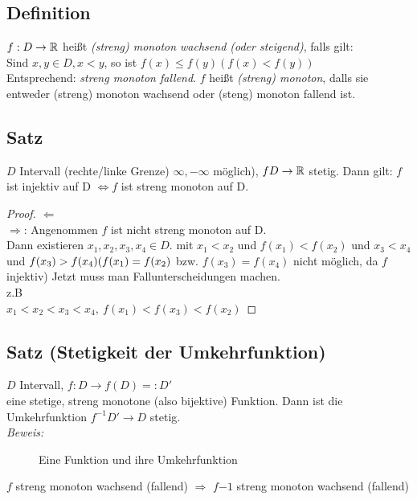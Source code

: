 \subsection{Definition}
$f: D \to \mathbb{R}$ hei\ss t {\em(streng) monoton wachsend (oder steigend)}, falls gilt:\\
Sind $x,y \in D, x < y$, so ist $f(x) \leq f(y) (f(x) < f(y))$\\
Entsprechend: {\em streng monoton fallend}. $f$ hei\ss t {\em (streng) monoton}, dalls sie entweder (streng) monoton wachsend oder (steng) monoton fallend ist.
\subsection[Satz: Injektive Funktionen nur bei Monotonie]{Satz}
$D$ Intervall (rechte/linke Grenze) $\infty,-\infty$ möglich), $f D \to \mathbb{R}$ stetig. Dann gilt: $f$ ist injektiv auf D $\Leftrightarrow f $ ist streng monoton auf D.
\begin{proof}
$\Leftarrow$ \checkmark \\
$\Rightarrow$: Angenommen $f$ ist nicht streng monoton auf D.\\
Dann existieren $x_1,x_2,x_3,x_4 \in D.$ mit $x_1 < x_2$ und $f(x_1) < f(x_2)$ und $x_3 < x_4$ und $f(x_3) > f(x_4)\\
(f(x_1) = f(x_2)$ bzw. $f(x_3) = f(x_4)$ nicht möglich, da $f$ injektiv)
Jetzt muss man Fallunterscheidungen machen.\\
z.B\\
$x_1 < x_2 < x_3 < x_4,\ f(x_1) < f(x_3) < f(x_2)$
\end{proof}
\subsection{Satz (Stetigkeit der Umkehrfunktion)}\label{sec:5.14}
$D$ Intervall, $f : D \to f(D) =: D'$\\
eine stetige, streng monotone (also bijektive) Funktion. Dann ist die Umkehrfunktion $f^{-1} D' \to D$ stetig.\\
{\em Beweis:} \cite{k5}
\begin{figure}[h!]
\centering
{}
\caption{Eine Funktion und ihre Umkehrfunktion}
\end{figure}
$f$ streng monoton wachsend (fallend) $\Rightarrow$ $f{-1}$ streng monoton wachsend (fallend)
